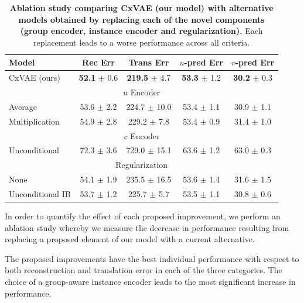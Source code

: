 \documentclass[nohyperref]{article}
\theoremstyle{plain}
\theoremstyle{definition}
\theoremstyle{remark}
\begin{document}
\begin{table}[t]
    \caption{\textbf{Ablation study comparing CxVAE (our model) with alternative models obtained by replacing each of the novel components (group encoder, instance encoder and regularization).} Each replacement leads to a worse performance across all criteria.}
    \label{ablation}
    \vskip 0.15in
    \begin{center}
    \begin{small}
    \begin{sc}
    \begin{tabular}{lcccc}
    \toprule
    Model & Rec Err & Trans Err & $u$-pred Err & $v$-pred Err \\
    \midrule
    CxVAE (ours) & \textbf{52.1} $\pm$ 0.6 & \textbf{219.5} $\pm$ 4.7 & \textbf{53.3} $\pm$ 1.2 & \textbf{30.2} $\pm$ 0.3 \\ 
    \midrule \multicolumn{5}{c}{$u$ Encoder} \\ \midrule
    Average & 53.6 $\pm$ 2.2 & 224.7 $\pm$ 10.0 & 53.4 $\pm$ 1.1 & 30.9 $\pm$ 1.1 \\
    Multiplication & 54.9 $\pm$ 2.8 & 229.2 $\pm$ 7.8 & 53.4 $\pm$ 0.9 & 31.4 $\pm$ 1.0 \\ 
    \midrule \multicolumn{5}{c}{$v$ Encoder} \\ \midrule
    Unconditional & 72.3 $\pm$ 3.6 & 729.0 $\pm$ 15.1 & 63.6 $\pm$ 1.2 & 63.0 $\pm$ 0.3 \\
    \midrule \multicolumn{5}{c}{Regularization} \\ \midrule
    None & 54.1 $\pm$ 1.9 & 235.5 $\pm$ 16.5 & 53.6 $\pm$ 1.4 & 31.6 $\pm$ 1.5 \\
    Unconditional IB & 53.7 $\pm$ 1.2 & 225.7 $\pm$ 5.7 & 53.5 $\pm$ 1.1 & 30.8 $\pm$ 0.6 \\
    \bottomrule
    \end{tabular}
    \end{sc}
    \end{small}
    \end{center}
    \vskip -0.1in
\end{table}

In order to quantify the effect of each proposed improvement, we perform an ablation study whereby we measure the decrease in performance resulting from replacing a proposed element of our model with a current alternative.

The proposed improvements have the best individual performance with respect to both reconstruction and translation error in each of the three categories. The choice of a group-aware instance encoder leads to the most significant increase in performance.
\end{document}
